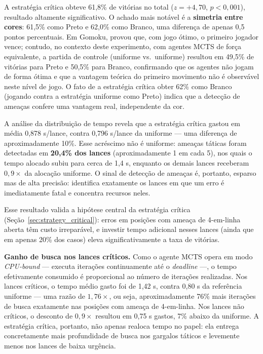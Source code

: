 \documentclass[cic,tc]{iiufrgs}
\begin{document}
A estratégia crítica obteve 61,8\% de vitórias no total ($z = +4{,}70$, $p < 0{,}001$), resultado altamente significativo. O achado mais notável é a \textbf{simetria entre cores}: 61,5\% como Preto e 62,0\% como Branco, uma diferença de apenas 0,5 pontos percentuais. Em Gomoku, \citet{allis1994searching} provou que, com jogo ótimo, o primeiro jogador vence; contudo, no contexto deste experimento, com agentes MCTS de força equivalente, a partida de controle (uniforme vs.\ uniforme) resultou em 49,5\% de vitórias para Preto e 50,5\% para Branco, confirmando que os agentes não jogam de forma ótima e que a vantagem teórica do primeiro movimento não é observável neste nível de jogo. O fato de a estratégia crítica obter 62\% como Branco (jogando contra a estratégia uniforme como Preto) indica que a detecção de ameaças confere uma vantagem real, independente da cor.

A análise da distribuição de tempo revela que a estratégia crítica gastou em média 0,878 s/lance, contra 0,796 s/lance da uniforme — uma diferença de aproximadamente 10\%. Esse acréscimo não é uniforme: ameaças táticas foram detectadas em \textbf{20,4\% dos lances} (aproximadamente 1 em cada 5), nos quais o tempo alocado subiu para cerca de 1,4 s, enquanto os demais lances receberam $0{,}9\times$ da alocação uniforme. O sinal de detecção de ameaças é, portanto, esparso mas de alta precisão: identifica exatamente os lances em que um erro é imediatamente fatal e concentra recursos neles.

Esse resultado valida a hipótese central da estratégia crítica (Seção~\ref{sec:strategy_critical}): erros em posições com ameaça de 4-em-linha aberta têm custo irreparável, e investir tempo adicional nesses lances (ainda que em apenas 20\% dos casos) eleva significativamente a taxa de vitórias.

\textbf{Ganho de busca nos lances críticos.} Como o agente MCTS opera em modo \emph{CPU-bound} — executa iterações continuamente até o \emph{deadline} —, o tempo efetivamente consumido é proporcional ao número de iterações realizadas. Nos lances críticos, o tempo médio gasto foi de 1,42 s, contra 0,80 s da referência uniforme — uma razão de $1{,}76\times$, ou seja, aproximadamente 76\% mais iterações de busca exatamente nas posições com ameaça de 4-em-linha. Nos lances não críticos, o desconto de $0{,}9\times$ resultou em 0,75 s gastos, 7\% abaixo da uniforme. A estratégia crítica, portanto, não apenas realoca tempo no papel: ela entrega concretamente mais profundidade de busca nos gargalos táticos e levemente menos nos lances de baixa urgência.
\end{document}
